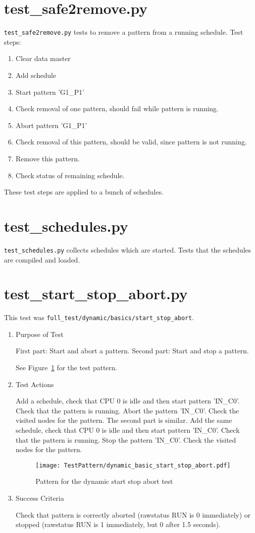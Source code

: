 \documentclass[12pt,a4paper]{report}
\begin{document}
\section{test\_safe2remove.py}
\texttt{test\_safe2remove.py} tests to remove a pattern from a running schedule. Test steps:
\begin{enumerate}
\item Clear data master
\item Add schedule
\item Start pattern 'G1\_P1'
\item Check removal of one pattern, should fail while pattern is running.
\item Abort pattern 'G1\_P1'
\item Check removal of this pattern, should be valid, since pattern is not running.
\item Remove this pattern.
\item Check status of remaining schedule.
\end{enumerate}
These test steps are applied to a bunch of schedules.
\section{test\_schedules.py}
\texttt{test\_schedules.py} collects schedules which are started. Tests that the schedules are compiled and loaded.



\section{test\_start\_stop\_abort.py}
This test was \texttt{full\_test/dynamic/basics/start\_stop\_abort}.
\begin{enumerate}
	\item Purpose of Test

    First part: Start and abort a pattern. Second part: Start and stop a pattern.

	See Figure~\ref{fig:Pattern_for_the_dynamic_start_stop_abort_test} for the test pattern.
	\item Test Actions

    Add a schedule, check that CPU 0 is idle and then start pattern 'IN\_C0'. Check that the pattern is running.
    Abort the pattern 'IN\_C0'. Check the visited nodes for the pattern. The second part is similar.
    Add the same schedule, check that CPU 0 is idle and then start pattern 'IN\_C0'. Check that the pattern is running.
    Stop the pattern 'IN\_C0'. Check the visited nodes for the pattern.
    \begin{figure}
        \centering
        \texttt{[image: TestPattern/dynamic\_basic\_start\_stop\_abort.pdf]}
        \caption{Pattern for the dynamic start stop abort test}
        \label{fig:Pattern_for_the_dynamic_start_stop_abort_test}
    \end{figure}
	\item Success Criteria

	Check that pattern is correctly aborted (rawstatus RUN is 0 immediately) or
	stopped (rawstatus RUN is 1 immediately, but 0 after 1.5 seconds).
\end{enumerate}
\end{document}
